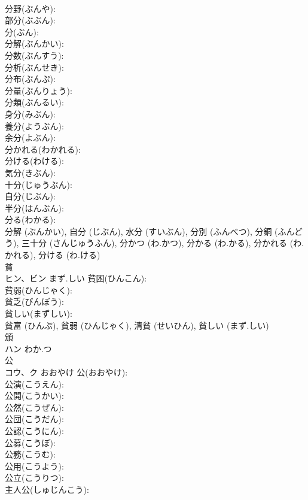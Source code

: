 \documentclass[8pt]{extreport}
\begin{document}
\begin{CJK}{UTF8}{min}
\\	分野(ぶんや): 
\\	部分(ぶぶん): 
\\	分(ぶん): 
\\	分解(ぶんかい): 
\\	分数(ぶんすう): 
\\	分析(ぶんせき): 
\\	分布(ぶんぷ): 
\\	分量(ぶんりょう): 
\\	分類(ぶんるい): 
\\	身分(みぶん): 
\\	養分(ようぶん): 
\\	余分(よぶん): 
\\	分かれる(わかれる): 
\\	分ける(わける): 
\\	気分(きぶん): 
\\	十分(じゅうぶん): 
\\	自分(じぶん): 
\\	半分(はんぶん): 
\\	分る(わかる): 
\\	分解 (ぶんかい), 自分 (じぶん), 水分 (すいぶん), 分別 (ふんべつ), 分銅 (ふんどう), 三十分 (さんじゅうふん), 分かつ (わ.かつ), 分かる (わ.かる), 分かれる (わ.かれる), 分ける (わ.ける)
\\	貧			
\\	ヒン、ビン	まず.しい	貧困(ひんこん): 
\\	貧弱(ひんじゃく): 
\\	貧乏(びんぼう): 
\\	貧しい(まずしい): 
\\	貧富 (ひんぷ), 貧弱 (ひんじゃく), 清貧 (せいひん), 貧しい (まず.しい)
\\	頒			
\\	ハン	わか.つ		
\\	公			
\\	コウ、ク	おおやけ	公(おおやけ): 
\\	公演(こうえん): 
\\	公開(こうかい): 
\\	公然(こうぜん): 
\\	公団(こうだん): 
\\	公認(こうにん): 
\\	公募(こうぼ): 
\\	公務(こうむ): 
\\	公用(こうよう): 
\\	公立(こうりつ): 
\\	主人公(しゅじんこう): 

\end{CJK}
\end{document}
